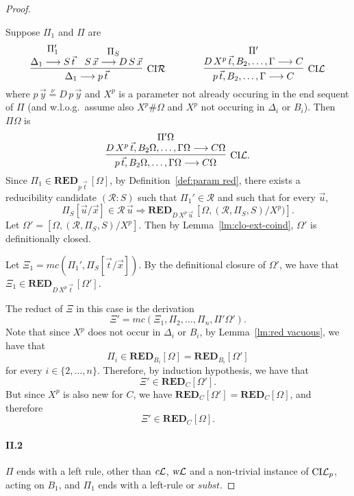 \documentclass[preprint]{elsarticle}
\def\Rscr{{\mathcal R}}
\newcommand{\Seq}[2]{#1\longrightarrow #2}
\newcommand{\cL}{\hbox{\sl c}{\cal L}}
\newcommand{\defnu}{\stackrel{\nu}{=}}
\newcommand{\coindR}{{\rm CI}{\cal R}}
\newcommand{\coindL}{{\rm CI}{\cal L}}
\newcommand{\coindLP}{{\rm CI}{\cal L}_p}
\newcommand{\wL}{\hbox{\sl w}{\cal L}}
\def\RED{{\mathbf{RED}}}
\begin{document}
\begin{proof}
\begin{trivlist}
\item[\fbox{$\coindR/\coindL$}] Suppose $\Pi_1$ and $\Pi$ are
$$
\infer[\coindR] {\Seq{\Delta_1}{p\,\vec{t}}} {
  \deduce{\Seq{\Delta_1}{S\,\vec{t}}}{\Pi_1'} &
  \deduce{\Seq{S\,\vec{x}}{D\,S\,\vec{x}}}{\Pi_S} } \qquad \qquad
\infer[\coindL] {\Seq{p\,\vec{t}, B_2, \dots, \Gamma}{C}}
{\deduce{\Seq{D\,X^p\,\vec{t},B_2,\dots, \Gamma}{C}}{\Pi'}}
$$
where $p\,\vec{y}\defnu D\,p\,\vec{y}$ and $X^p$ is a parameter not
already occuring in the end sequent of $\Pi$ (and w.l.o.g.\ assume also
$X^p \# \Omega$ and $X^p$ not occuring in $\Delta_i$ or $B_i$).  Then
$\Pi\Omega$ is
$$
\infer[\coindL.]  {\Seq{p\,\vec{t}, B_2\Omega, \dots,
    \Gamma\Omega}{C\Omega}}
{\deduce{\Seq{D\,X^p\,\vec{t},B_2\Omega,\dots,
      \Gamma\Omega}{C\Omega}}{\Pi'\Omega}}
$$
Since $\Pi_1 \in \RED_{p\,\vec t}\, [\Omega]$, by
Definition~\ref{def:param red}, there exists a reducibility candidate
$(\Rscr : S)$ such that $\Pi_1' \in \Rscr$ and such that for every
$\vec u$,
$$
\Pi_S[\vec u/\vec x] \in \Rscr\,\vec u \Rightarrow \RED_{D\,X^p\,\vec
  u}\, [\Omega, (\Rscr,\Pi_S,S)/X^p)].
$$
Let $\Omega' = [\Omega, (\Rscr, \Pi_S,S)/X^p]$.  Then by
Lemma~\ref{lm:clo-ext-coind}, $\Omega'$ is definitionally closed.

Let $\Xi_1 = mc(\Pi_1', \Pi_S[\vec t/\vec x])$. By the definitional
closure of $\Omega'$, we have that $\Xi_1 \in \RED_{D\,X^p\,\vec
  t}\, [\Omega']$.

The reduct of $\Xi$ in this case is the derivation
$$
\Xi' = mc(\Xi_1,\Pi_2,\ldots,\Pi_n,\Pi'\Omega').
$$
Note that since $X^p$ does not occur in $\Delta_i$ or $B_i$, by
Lemma~\ref{lm:red vacuous}, we have that
$$
\Pi_i \in \RED_{B_i}[\Omega] = \RED_{B_i}[\Omega']
$$
for every $i\in\{2,\ldots,n\}$.  Therefore, by induction hypothesis,
we have that
$$
\Xi' \in \RED_C[\Omega'].
$$
But since $X^p$ is also new for $C$, we have $\RED_C[\Omega'] =
\RED_C[\Omega]$, and therefore
$$
\Xi' \in \RED_C[\Omega].
$$
\end{trivlist}

\paragraph{\bf II.2} $\Pi$ ends with a left rule, other than $\cL$,
$\wL$ and a non-trivial instance of $\coindLP$, acting on $B_1$, and
$\Pi_1$ ends with a left-rule or $subst$.


\end{proof}
\end{document}
